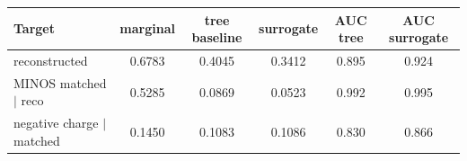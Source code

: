 \begin{tabular}{lccccc}
\toprule
Target & marginal & tree baseline & surrogate & AUC tree & AUC surrogate \\
\midrule
reconstructed & 0.6783 & 0.4045 & 0.3412 & 0.895 & 0.924 \\
MINOS matched $\mid$ reco & 0.5285 & 0.0869 & 0.0523 & 0.992 & 0.995 \\
negative charge $\mid$ matched & 0.1450 & 0.1083 & 0.1086 & 0.830 & 0.866 \\
\bottomrule
\end{tabular}
